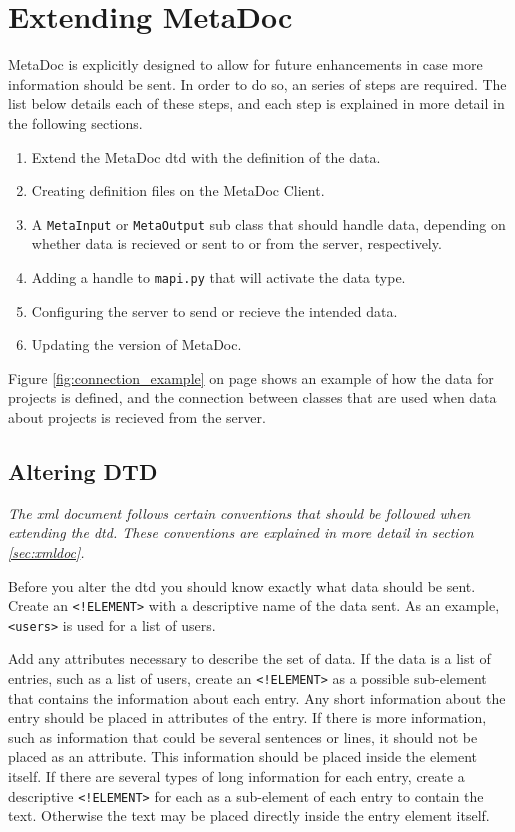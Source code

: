 \newpage
\section{Extending MetaDoc}
\label{sec:extending}
MetaDoc is explicitly designed to allow for future enhancements in case more
information should be sent. In order to do so, an series of steps are required.
The list below details each of these steps, and each step is explained in more
detail in the following sections.

\begin{enumerate}
    \item
        Extend the MetaDoc \gls{dtd} with the definition of the data.
    \item
        Creating definition files on the MetaDoc Client.
    \item
        A \texttt{MetaInput} or \texttt{MetaOutput} sub class that should
        handle data, depending on whether data is recieved or sent to or from
        the server, respectively.
    \item
        Adding a handle to \texttt{mapi.py} that will activate the data type.
    \item
        Configuring the server to send or recieve the intended data.
    \item
        Updating the version of MetaDoc.
\end{enumerate}

Figure \ref{fig:connection_example} on page \pageref{fig:connection_example}
shows an example of how the data for projects is defined, and the connection
between classes that are used when data about projects is recieved from the
server.


\subsection{Altering DTD}
\textit{The \gls{xml} document follows certain conventions that should be
followed when extending the \gls{dtd}. These conventions are explained in more
detail in section \ref{sec:xmldoc}.}

Before you alter the \gls{dtd} you should know exactly what data should be
sent.  Create an \texttt{<!ELEMENT>} with a descriptive name of the data sent.
As an example, \texttt{<users>} is used for a list of users. 

Add any attributes necessary to describe the set of data. If the data is a list
of entries, such as a list of users, create an \texttt{<!ELEMENT>} as a
possible sub-element that contains the information about each entry. Any short
information about the entry should be placed in attributes of the entry. If
there is more information, such as information that could be several sentences
or lines, it should not be placed as an attribute. This information should be
placed inside the element itself. If there are several types of long
information for each entry, create a descriptive \texttt{<!ELEMENT>} for each
as a sub-element of each entry to contain the text. Otherwise the text may be
placed directly inside the entry element itself. 

